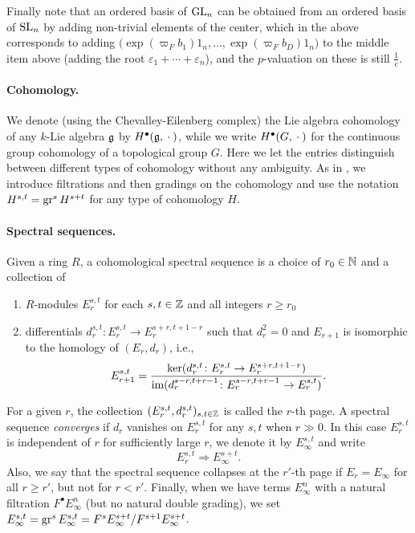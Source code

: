 Finally note that an ordered basis of $\operatorname{GL}_{n}$ can be obtained from an ordered basis of $\operatorname{SL}_{n}$ by adding non-trivial elements of the center, which in the above corresponds to adding $\bigl(  \exp(\varpi_{F}b_{1})1_{n}, \dotsc, \exp(\varpi_{F}b_{D})1_{n} \bigr)$ to the middle item above (adding the root $\varepsilon_{1} + \dotsb + \varepsilon_{n}$), and the $p$-valuation on these is still $\frac{1}{e}$.

\paragraph{Cohomology.} We denote (using the Chevalley-Eilenberg complex) the Lie algebra cohomology of any $k$-Lie algebra $\mathfrak{g}$ by $H^{\bullet}(\mathfrak{g}, \:\cdot\:)$, while we write $H^{\bullet}(G,\:\cdot\:)$ for the continuous group cohomology of a topological group $G$. Here we let the entries distinguish between different types of cohomology without any ambiguity. As in , we introduce filtrations and then gradings on the cohomology and use the notation $H^{s,t} = \operatorname{gr}^{s}H^{s+t}$ for any type of cohomology $H$.

\paragraph{Spectral sequences.} Given a ring $R$, a cohomological spectral sequence is a choice of $r_0 \in \mathbb{N}$ and a collection of
\begin{enumerate}[$\bullet$]
  \item $R$-modules $E_r^{s,t}$ for each $s,t \in \mathbb{Z}$ and all integers $r \geq r_0$
  \item differentials $d_r^{s,t} \colon E_r^{s,t} \to E_r^{s+r,t+1-r}$ such that $d_r^2 = 0$ and $E_{r+1}$ is isomorphic to the homology of $(E_r,d_r)$, i.e.,
  \[
    E_{r+1}^{s,t} = \frac{\operatorname{ker}(d_r^{s,t} \colon E_r^{s,t} \to E_r^{s+r,t+1-r})}{\operatorname{im}(d_r^{s-r,t+r-1} \colon E_r^{s-r,t+r-1} \to E_r^{s,t})}.
  \]
\end{enumerate}
For a given $r$, the collection $(E_r^{s,t},d_r^{s,t})_{s,t\in\mathbb{Z}}$ is called the $r$-th page. A spectral sequence \emph{converges} if $d_r$ vanishes on $E_r^{s,t}$ for any $s,t$ when $r\gg0$. In this case $E_r^{s,t}$ is independent of $r$ for sufficiently large $r$, we denote it by $E_{\infty}^{s,t}$ and write
  \[
    E_{r}^{s,t} \Longrightarrow E_\infty^{s+t}.
  \]
Also, we say that the spectral sequence collapses at the $r'$-th page if $E_{r} = E_{\infty}$ for all $r \geq r'$, but not for $r < r'$. Finally, when we have terms $E_\infty^{n}$  with a natural filtration $F^\bullet E_\infty^n$ (but no natural double grading), we set $E_\infty^{s,t} = \operatorname{gr}^{s} E_\infty^{s,t}= F^{s}E_\infty^{s+t}/F^{s+1}E_\infty^{s+t}$.

